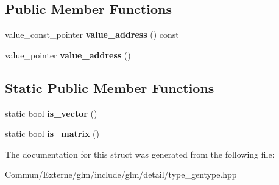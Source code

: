 \subsection*{Public Member Functions}
\begin{DoxyCompactItemize}
\item 
value\+\_\+const\+\_\+pointer {\bfseries value\+\_\+address} () const \hypertarget{structglm_1_1detail_1_1gen_type_a63fb77e77082f34c0a0d7faa0906f7f4}{}\label{structglm_1_1detail_1_1gen_type_a63fb77e77082f34c0a0d7faa0906f7f4}

\item 
value\+\_\+pointer {\bfseries value\+\_\+address} ()\hypertarget{structglm_1_1detail_1_1gen_type_a146973ec142766743080c1895a9e3c65}{}\label{structglm_1_1detail_1_1gen_type_a146973ec142766743080c1895a9e3c65}

\end{DoxyCompactItemize}
\subsection*{Static Public Member Functions}
\begin{DoxyCompactItemize}
\item 
static bool {\bfseries is\+\_\+vector} ()\hypertarget{structglm_1_1detail_1_1gen_type_ae83087df55201bdc46a37decf3d1c34c}{}\label{structglm_1_1detail_1_1gen_type_ae83087df55201bdc46a37decf3d1c34c}

\item 
static bool {\bfseries is\+\_\+matrix} ()\hypertarget{structglm_1_1detail_1_1gen_type_a78c650375558d5e2ccfba383cdb59479}{}\label{structglm_1_1detail_1_1gen_type_a78c650375558d5e2ccfba383cdb59479}

\end{DoxyCompactItemize}


The documentation for this struct was generated from the following file\+:\begin{DoxyCompactItemize}
\item 
Commun/\+Externe/glm/include/glm/detail/type\+\_\+gentype.\+hpp\end{DoxyCompactItemize}
